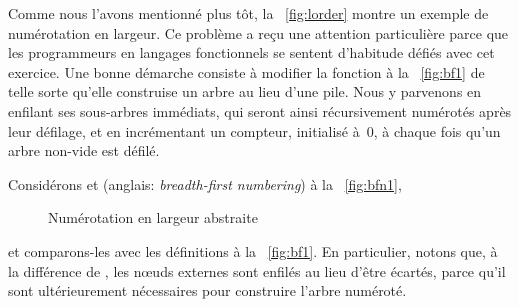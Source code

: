 Comme nous l'avons mentionné plus tôt, la \fig~\vref{fig:lorder}
montre un exemple de numérotation en largeur. Ce problème a reçu une
attention particulière
\citep{JonesGibbons_1993,GibbonsJones_1998,Okasaki_2000} parce que les
programmeurs en langages fonctionnels se sentent d'habitude défiés
avec cet exercice. Une bonne démarche consiste à modifier la fonction
 à la \fig~\vref{fig:bf1}
de telle sorte qu'elle construise un arbre au lieu d'une pile. Nous y
parvenons en enfilant ses sous-arbres immédiats, qui seront ainsi
récursivement numérotés après leur défilage, et en incrémentant un
compteur, initialisé à~\(0\), à chaque fois qu'un arbre non-vide est
défilé.

Considérons  et
 (anglais:
\emph{breadth-first numbering}) à la \fig~\vref{fig:bfn1},
\begin{figure}
\abovedisplayskip=0pt
\belowdisplayskip=0pt
\centering
{}
\caption{Numérotation en largeur abstraite}
\label{fig:bfn1}
\end{figure}
et comparons-les avec les définitions à la \fig~\vref{fig:bf1}. En
particulier, notons que, à la différence de
, les nœuds externes
sont enfilés au lieu d'être écartés, parce qu'il sont ultérieurement
nécessaires pour construire l'arbre numéroté.

